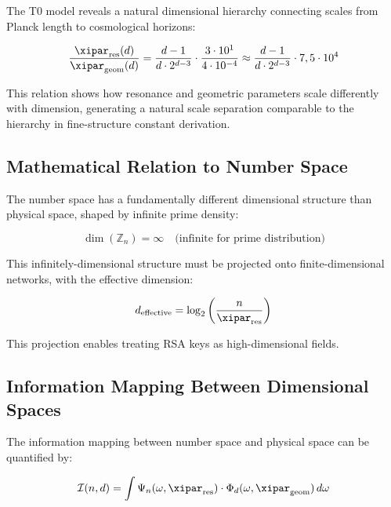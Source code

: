 	The T0 model reveals a natural dimensional hierarchy connecting scales from Planck length to cosmological horizons:
	
	\begin{equation}
		\frac{\xipar_{\text{res}}(d)}{\xipar_{\text{geom}}(d)} = \frac{d-1}{d \cdot 2^{d-3}} \cdot \frac{3 \cdot 10^1}{4 \cdot 10^{-4}} \approx \frac{d-1}{d \cdot 2^{d-3}} \cdot 7,5 \cdot 10^4
	\end{equation}
	
	This relation shows how resonance and geometric parameters scale differently with dimension, generating a natural scale separation comparable to the hierarchy in fine-structure constant derivation.
	
	\subsection{Mathematical Relation to Number Space}
	\label{subsec:zahlenraum_relation}
	
	The number space has a fundamentally different dimensional structure than physical space, shaped by infinite prime density:
	
	\begin{equation}
		\dim(\mathbb{Z}_n) = \infty \quad \text{(infinite for prime distribution)}
	\end{equation}
	
	This infinitely-dimensional structure must be projected onto finite-dimensional networks, with the effective dimension:
	
	\begin{equation}
		d_{\text{effective}} = \log_2\left(\frac{n}{\xipar_{\text{res}}}\right)
	\end{equation}
	
	This projection enables treating RSA keys as high-dimensional fields.
	
	\subsection{Information Mapping Between Dimensional Spaces}
	\label{subsec:information_mapping}
	
	The information mapping between number space and physical space can be quantified by:
	
	\begin{equation}
		\mathcal{I}(n, d) = \int \Psi_n(\omega, \xipar_{\text{res}}) \cdot \Phi_d(\omega, \xipar_{\text{geom}}) \, d\omega
	\end{equation}
	
